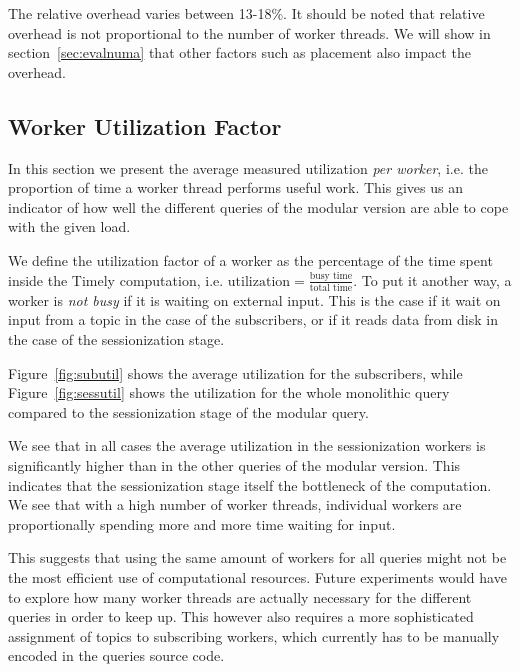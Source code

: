 The relative overhead varies between 13-18\%. It should be noted that relative
overhead is not proportional to the number of worker threads. We will show
in section~\ref{sec:evalnuma} that other factors such as placement also
impact the overhead.

\subsection{Worker Utilization Factor}

In this section we present the average measured utilization \emph{per worker},
i.e. the proportion of time a worker thread performs useful work.
This gives us an indicator of how well the different queries of the modular
version are able to cope with the given load.

We define the utilization factor of a worker as the percentage of
the time spent inside the Timely computation, i.e.
$\text{utilization} = \frac{\text{busy time}}{\text{total time}}$.
To put it another way, a worker is \emph{not busy} if it is waiting on external input.
This is the case if it wait on input from a topic in the case of the subscribers, 
or if it reads data from disk in the case of the sessionization stage.

Figure~\ref{fig:subutil} shows the average utilization for the subscribers, while
Figure~\ref{fig:sessutil} shows the utilization for the whole monolithic query
compared to the sessionization stage of the modular query. 

We see that in all cases the average utilization in the sessionization workers
is significantly higher than in the other queries of the modular version. This indicates
that the sessionization stage itself the bottleneck of the computation. 
We see that with a high number of worker threads, individual workers are proportionally
spending more and more time waiting for input.

This suggests that using the same amount of workers for all queries might
not be the most efficient use of computational resources. Future experiments would have to
explore how many worker threads are actually necessary for the different queries
in order to keep up. This however also requires a more sophisticated assignment of
topics to subscribing workers, which currently has to be manually encoded in
the queries source code.

